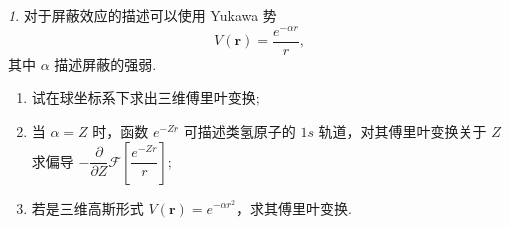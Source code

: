 \documentclass[11pt]{article}
\theoremstyle{remark}
\newtheorem{problem}{}
\theoremstyle{definition}
\begin{document}
\begin{problem}
  对于屏蔽效应的描述可以使用 Yukawa 势
  \[
  V(\mathbf{r})=\frac{e^{-\alpha r}}{r},
  \]
  其中 $\alpha$ 描述屏蔽的强弱.
  \begin{enumerate}
    \item 试在球坐标系下求出三维傅里叶变换;
    \item 当 $\alpha=Z$ 时，函数 $e^{-Zr}$ 可描述类氢原子的 $1s$ 轨道，对其傅里叶变换关于 $Z$ 求偏导
    $-\dfrac{\partial}{\partial Z}\mathcal{F}\!\left[\dfrac{e^{-Zr}}{r}\right]$;
    \item 若是三维高斯形式 $V(\mathbf{r})=e^{-\alpha r^2}$，求其傅里叶变换.
  \end{enumerate}
\end{problem}
\end{document}
